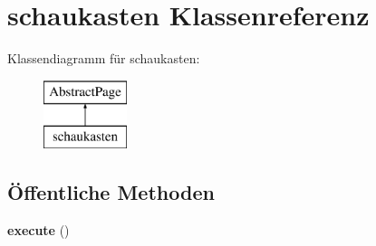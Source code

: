 \hypertarget{classschaukasten}{}\section{schaukasten Klassenreferenz}
\label{classschaukasten}
Klassendiagramm für schaukasten\+:\begin{figure}[H]
\begin{center}
\leavevmode
\includegraphics[height=2.000000cm]{classschaukasten}
\end{center}
\end{figure}
\subsection*{Öffentliche Methoden}
\begin{DoxyCompactItemize}
\item 
\mbox{\label{classschaukasten_a4d36cb2b803973895bf489b2776705dd}} 
{\bfseries execute} ()
\end{DoxyCompactItemize}
